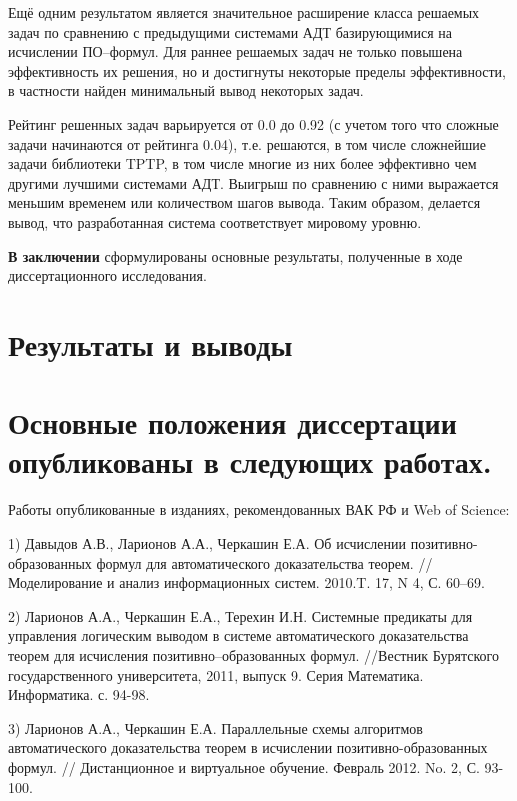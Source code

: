 \documentclass[a4paper]{report}
\begin{document}
Ещё одним результатом является значительное расширение класса решаемых задач по сравнению с предыдущими системами АДТ базирующимися на исчислении ПО--формул. Для раннее решаемых задач не только повышена эффективность их решения, но и достигнуты некоторые пределы эффективности, в частности найден минимальный вывод некоторых задач.

Рейтинг решенных задач варьируется от 0.0 до 0.92 (с учетом того что сложные задачи начинаются от рейтинга 0.04), т.е. решаются, в том числе сложнейшие задачи библиотеки TPTP, в том числе многие из них более эффективно чем другими лучшими системами АДТ. Выигрыш по сравнению с ними выражается меньшим временем или количеством шагов вывода. Таким образом, делается вывод, что разработанная система соответствует мировому уровню.



\textbf{В заключении} сформулированы основные результаты, полученные в ходе диссертационного исследования.

\section*{Результаты и выводы}  %


\section*{Основные положения диссертации опубликованы в следующих работах.}

Работы опубликованные в изданиях, рекомендованных ВАК РФ и Web of Science:

1) Давыдов А.В., Ларионов А.А., Черкашин Е.А. Об исчислении
позитивно-образованных формул для автоматического доказательства
теорем. // Моделирование и анализ информационных систем. 2010.T. 17, N
4, С. 60--69.

2) Ларионов А.А., Черкашин Е.А., Терехин И.Н. Системные предикаты для
управления логическим выводом в системе автоматического доказательства
теорем для исчисления позитивно--образованных формул. //Вестник
Бурятского государственного университета, 2011, выпуск 9. Серия
Математика. Информатика. с. 94-98.

3) Ларионов А.А., Черкашин Е.А. Параллельные схемы алгоритмов
автоматического доказательства теорем в исчислении
позитивно-образованных формул. // Дистанционное и виртуальное
обучение. Февраль 2012. No. 2, С. 93-100.
\end{document}
